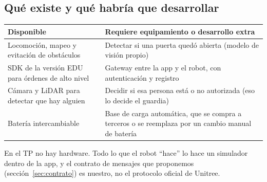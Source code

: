 \subsection{Qué existe y qué habría que desarrollar}

\begin{table}[H]
\centering\small
\begin{tabularx}{\textwidth}{@{}L L@{}}
\toprule
\textbf{Disponible} & \textbf{Requiere equipamiento o desarrollo extra} \\
\midrule
Locomoción, mapeo y evitación de obstáculos & Detectar si una puerta quedó abierta (modelo de visión propio) \\
SDK de la versión EDU para órdenes de alto nivel & Gateway entre la app y el robot, con autenticación y registro \\
Cámara y LiDAR para detectar que hay alguien & Decidir si esa persona está o no autorizada (eso lo decide el guardia) \\
Batería intercambiable & Base de carga automática, que se compra a terceros o se reemplaza por un cambio manual de batería \\
\bottomrule
\end{tabularx}
\end{table}

En el TP no hay hardware. Todo lo que el robot ``hace'' lo hace un simulador dentro de la app, y el contrato de mensajes que proponemos (sección~\ref{sec:contrato}) es nuestro, no el protocolo oficial de Unitree.
